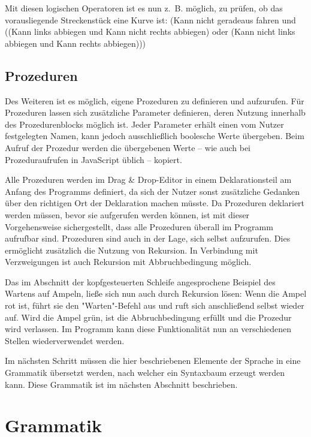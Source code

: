 Mit diesen logischen Operatoren ist es nun z.~B. möglich, zu prüfen, ob das vorausliegende Streckenstück eine Kurve ist: (Kann nicht geradeaus fahren und ((Kann links abbiegen und Kann nicht rechts abbiegen) oder (Kann nicht links abbiegen und Kann rechts abbiegen)))

\subsection*{Prozeduren}
\label{sec:implementation:elements:proc}

Des Weiteren ist es möglich, eigene Prozeduren zu definieren und aufzurufen. Für Prozeduren lassen sich zusätzliche Parameter definieren, deren Nutzung innerhalb des Prozedurenblocks möglich ist. Jeder Parameter erhält einen vom Nutzer festgelegten Namen, kann jedoch ausschließlich boolesche Werte übergeben. Beim Aufruf der Prozedur werden die übergebenen Werte -- wie auch bei Prozeduraufrufen in JavaScript üblich -- kopiert.

Alle Prozeduren werden im Drag \& Drop-Edi\-tor in einem Deklarationsteil am Anfang des Programms definiert, da sich der Nutzer sonst zusätzliche Gedanken über den richtigen Ort der Deklaration machen müsste. Da Prozeduren deklariert werden müssen, bevor sie aufgerufen werden können, ist mit dieser Vorgehensweise sichergestellt, dass alle Prozeduren überall im Programm aufrufbar sind. Prozeduren sind auch in der Lage, sich selbst aufzurufen. Dies ermöglicht zusätzlich die Nutzung von Rekursion. In Verbindung mit Verzweigungen ist auch Rekursion mit Abbruchbedingung möglich.

Das im Abschnitt der kopfgesteuerten Schleife angesprochene Beispiel des Wartens auf Ampeln, ließe sich nun auch durch Rekursion lösen: Wenn die Ampel rot ist, führt sie den "Warten"-Be\-fehl aus und ruft sich anschließend selbst wieder auf. Wird die Ampel grün, ist die Abbruchbedingung erfüllt und die Prozedur wird verlassen. Im Programm kann diese Funktionalität nun an verschiedenen Stellen wiederverwendet werden.

Im nächsten Schritt müssen die hier beschriebenen Elemente der Sprache in eine Grammatik übersetzt werden, nach welcher ein Syntaxbaum erzeugt werden kann. Diese Grammatik ist im nächsten Abschnitt beschrieben.

\section{Grammatik}
\label{sec:implementation:grammar}

